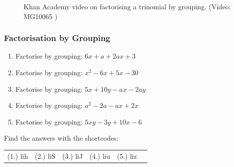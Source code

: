 	\begin{figure}[H] %
    \textnormal{Khan Academy video on factorising a trinomial by grouping.}\vspace{.1in} \nopagebreak
  \label{m39394*yt-media32}\label{m39394*yt-video32}
             { (Video:  MG10065 )}
      \vspace{2pt}
    \vspace{.1in}
 \end{figure}       \par \label{m39394*secfhsst!!!underscore!!!id2920}
            \subsubsection{  Factorisation by Grouping }
            \nopagebreak
      \label{m39394*id279000}\begin{enumerate}[noitemsep, label=\textbf{\arabic*}. ] 
            \label{m39394*uid48}\item Factorise by grouping: $6x+a+2ax+3$
\newline
        \label{m39394*uid49}\item Factorise by grouping: ${x}^{2}-6x+5x-30$\newline
        \label{m39394*uid50}\item Factorise by grouping: $5x+10y-ax-2ay$\newline
        \label{m39394*uid51}\item Factorise by grouping: ${a}^{2}-2a-ax+2x$\newline
        \label{m39394*uid52}\item Factorise by grouping: $5xy-3y+10x-6$\newline
        \end{enumerate}
  \label{m39394**end}
\par {} Find the answers with the shortcodes:
 \par \begin{tabular}[h]{cccccc}
 (1.) lih  &  (2.) liS  &  (3.) liJ  &  (4.) liu  &  (5.) liz  & \end{tabular}
